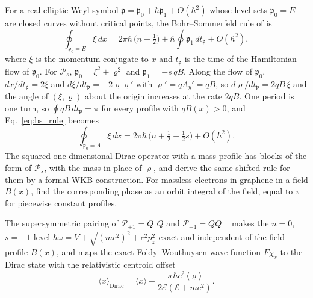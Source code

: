 \documentclass[aps,prd,onecolumn,tightenlines,nofootinbib,notitlepage,11pt,floatfix]{revtex4-2}
\theoremstyle{indentedtheorem}
\begin{document}
For a real elliptic Weyl symbol $\mathfrak{p} = \mathfrak{p}_0 + \hbar \mathfrak{p}_1 + O(\hbar^2)$ whose level sets $\mathfrak{p}_0=E$ are closed curves without critical points, the Bohr--Sommerfeld rule of \citet{IfaLouatiRouleux2017Bohr,IfaLouatiRouleux2020Erratum} is
\begin{equation}
    \oint_{\mathfrak{p}_0=E}\xi\,dx = 2\pi\hbar\,\big(n+\tfrac{1}{2}\big) + \hbar\oint \mathfrak{p}_1\,dt_\mathfrak{p} + O(\hbar^2) ,
    \label{eq:bs_rule}
\end{equation}
where $\xi$ is the momentum conjugate to $x$ and $t_\mathfrak{p}$ is the time of the Hamiltonian flow of $\mathfrak{p}_0$. For $\mathcal{P}_s$, $\mathfrak{p}_0 = \xi^2+\varrho^2$ and $\mathfrak{p}_1 = -s\,qB$. Along the flow of $\mathfrak{p}_0$, $dx/dt_\mathfrak{p}=2\xi$ and $d\xi/dt_\mathfrak{p}=-2\varrho\varrho'$ with $\varrho'=qA_y'=qB$, so $d\varrho/dt_\mathfrak{p}=2qB\,\xi$ and the angle of $(\xi,\varrho)$ about the origin increases at the rate $2qB$. One period is one turn, so $\oint qB\,dt_\mathfrak{p} = \pi$ for every profile with $qB(x)>0$, and Eq.~\eqref{eq:bs_rule} becomes
\begin{equation}
    \oint_{\mathfrak{p}_0=\Lambda}\xi\,dx =2\pi\hbar\,\big(n+\tfrac{1}{2}-\tfrac{1}{2}s\big) + O(\hbar^2) .
    \label{eq:rule_magnetic}
\end{equation}
The squared one-dimensional Dirac operator with a mass profile has blocks of the form of $\mathcal{P}_s$, with the mass in place of $\varrho$, and \citet{SuttonWatson2026WKB} derive the same shifted rule for them by a formal WKB construction. For massless electrons in graphene in a field $B(x)$, \citet{Kormanyos2008Bound} find the corresponding phase as an orbit integral of the field, equal to $\pi$ for piecewise constant profiles.

The supersymmetric pairing of $\mathcal{P}_{+1}=Q^\dagger Q$ and $\mathcal{P}_{-1}=QQ^\dagger$~\citep{CooperKhareSukhatme1995Supersymmetry} makes the $n=0$, $s=+1$ level $\hbar\omega = V + \sqrt{(mc^2)^2+c^2p_z^2}$ exact and independent of the field profile $B(x)$, and maps the exact Foldy--Wouthuysen wave function $F\check{\chi}_s$ to the Dirac state with the relativistic centroid offset
\begin{equation}
    \langle x\rangle_\text{Dirac} = \langle x\rangle - \frac{s\,\hbar c^2\,\langle\varrho\rangle}{2\mathcal{E}(\mathcal{E}+mc^2)} .
    \label{eq:centroid_offset}
\end{equation}
\end{document}
